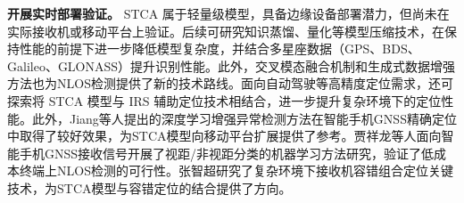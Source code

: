 \textbf{开展实时部署验证。} STCA 属于轻量级模型，具备边缘设备部署潜力，但尚未在实际接收机或移动平台上验证。后续可研究知识蒸馏、量化等模型压缩技术，在保持性能的前提下进一步降低模型复杂度，并结合多星座数据（GPS、BDS、Galileo、GLONASS）提升识别性能\cite{xu2025conv_lstm, qin2025bds, qi2025modelling}。此外，交叉模态融合机制\cite{xu2024cross_modal}和生成式数据增强方法\cite{zhu2025carnet}也为NLOS检测提供了新的技术路线。面向自动驾驶等高精度定位需求，还可探索将 STCA 模型与 IRS 辅助定位技术相结合\cite{zhu2024irs}，进一步提升复杂环境下的定位性能。此外，Jiang等人\cite{jiang2025outlier}提出的深度学习增强异常检测方法在智能手机GNSS精确定位中取得了较好效果，为STCA模型向移动平台扩展提供了参考。贾祥龙等人\cite{jia2025smartphone}面向智能手机GNSS接收信号开展了视距/非视距分类的机器学习方法研究，验证了低成本终端上NLOS检测的可行性。张智超\cite{zhang2025fault}研究了复杂环境下接收机容错组合定位关键技术，为STCA模型与容错定位的结合提供了方向。
